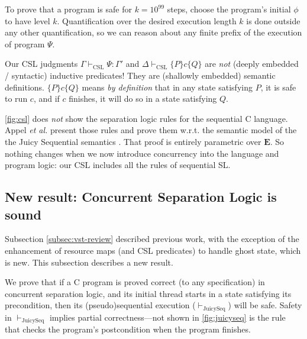 To prove that a program is safe for $k=10^{99}$ steps,
choose the program's initial $\phi$ to have level $k$.
Quantification over the desired execution length $k$
is done outside any other quantification,
so we can reason about any finite prefix of the execution of program $\Psi$.

Our CSL
judgments $\Gamma \vdash_\mathrm{CSL} \Psi:\Gamma'$
and $\Delta \vdash_\mathrm{CSL}\{P\} c \{Q\}$
are \emph{not} (deeply embedded / syntactic) inductive predicates!
They are (shallowly embedded) semantic definitions.
  $\{P\}c\{Q\}$ means \emph{by definition} \cite[Chapter 43]{appel14:plcc}
  that in any
  state satisfying $P$, it is safe to run $c$, and if $c$
  finishes, it will do so in a state satisfying $Q$.

\autoref{fig:csl} does \emph{not} show the separation logic rules for
the sequential C language. 
Appel \emph{et al.} present those rules \cite[Chapter 24]{appel14:plcc}
and prove them w.r.t.
the semantic model of the 
the Juicy Sequential semantics \cite[Part VI]{appel14:plcc}.
That proof is entirely parametric over $\mathbf{E}$.
So nothing changes when we now introduce
concurrency into the language and program logic:
our CSL includes all the rules of sequential SL.

\subsection{New result: Concurrent Separation Logic is sound}
Subsection \ref{subsec:vst-review} described previous work,
with the exception of the enhancement of resource maps (and CSL predicates)
to handle ghost state, which is new.  This subsection describes a
new result.

We prove that if a C program is proved correct (to any specification)
in concurrent separation logic, and its initial thread
starts in a state satisfying its
precondition, then its
(pseudo)sequential execution ($\vdash_\mathrm{JuicySeq}$) will be safe. 
Safety in $\vdash_\mathrm{JuicySeq}$ implies partial correctness---not shown in \autoref{fig:juicyseq} is the rule
\cite[pages 119--120]{stewart15:phd} that checks the
program's postcondition when the program finishes.

